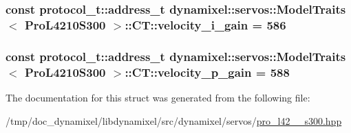 \subsubsection[{\texorpdfstring{velocity\+\_\+i\+\_\+gain}{velocity_i_gain}}]{\setlength{\rightskip}{0pt plus 5cm}const {\bf protocol\+\_\+t\+::address\+\_\+t} {\bf dynamixel\+::servos\+::\+Model\+Traits}$<$ {\bf Pro\+L4210\+S300} $>$\+::C\+T\+::velocity\+\_\+i\+\_\+gain = 586\hspace{0.3cm}{\ttfamily [static]}}\hypertarget{structdynamixel_1_1servos_1_1_model_traits_3_01_pro_l4210_s300_01_4_1_1_c_t_a2eb80ce99a027a426177d80bec135b61}{}\label{structdynamixel_1_1servos_1_1_model_traits_3_01_pro_l4210_s300_01_4_1_1_c_t_a2eb80ce99a027a426177d80bec135b61}
\subsubsection[{\texorpdfstring{velocity\+\_\+p\+\_\+gain}{velocity_p_gain}}]{\setlength{\rightskip}{0pt plus 5cm}const {\bf protocol\+\_\+t\+::address\+\_\+t} {\bf dynamixel\+::servos\+::\+Model\+Traits}$<$ {\bf Pro\+L4210\+S300} $>$\+::C\+T\+::velocity\+\_\+p\+\_\+gain = 588\hspace{0.3cm}{\ttfamily [static]}}\hypertarget{structdynamixel_1_1servos_1_1_model_traits_3_01_pro_l4210_s300_01_4_1_1_c_t_ae0ead7bf8821dc99c008826dc5977902}{}\label{structdynamixel_1_1servos_1_1_model_traits_3_01_pro_l4210_s300_01_4_1_1_c_t_ae0ead7bf8821dc99c008826dc5977902}


The documentation for this struct was generated from the following file\+:\begin{DoxyCompactItemize}
\item 
/tmp/doc\+\_\+dynamixel/libdynamixel/src/dynamixel/servos/\hyperlink{pro__l42__10__s300_8hpp}{pro\+\_\+l42\+\_\+\_\+s300.\+hpp}\end{DoxyCompactItemize}
